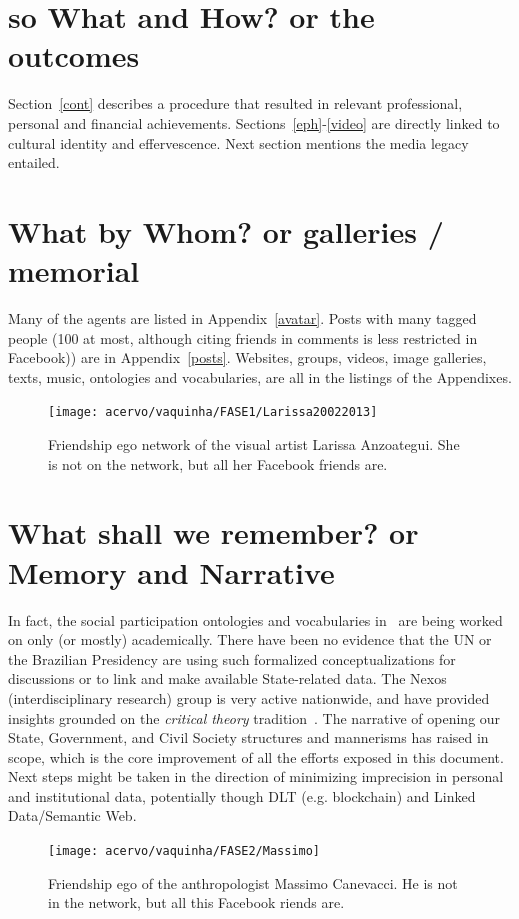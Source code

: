 \documentclass[a4paper]{article}
\begin{document}
\section{so What and How? or the outcomes}
Section~\ref{cont} describes a procedure that resulted in
relevant professional, personal and financial achievements.
Sections~\ref{eph}-\ref{video} are directly linked to cultural identity and effervescence.
Next section mentions the media legacy entailed.

\section{What by Whom? or galleries / memorial}
Many of the agents are listed in Appendix~\ref{avatar}.
Posts with many tagged people (100 at most, although citing friends in comments is less restricted in Facebook)) are in Appendix~\ref{posts}.
Websites, groups, videos, image galleries, texts, music, ontologies and vocabularies, are all in the listings of the Appendixes.

\begin{figure}[!h]
  \centering
    \texttt{[image: acervo/vaquinha/FASE1/Larissa20022013]}
  \caption{Friendship ego network of the visual artist Larissa Anzoategui. She is not on the network, but all her Facebook friends are.}
\end{figure}

\section{What shall we remember? or Memory and Narrative}
In fact, the social participation ontologies and vocabularies in~\cite{thesis}
are being worked on only (or mostly) academically.
There have been no evidence that the UN or the Brazilian Presidency are using
such formalized conceptualizations for discussions or to link and make available State-related data.
The Nexos (interdisciplinary research) group is very active nationwide,
and have provided insights grounded on the \emph{critical theory} tradition~\cite{anPhy2,thesis}.
The narrative of opening our State, Government, and Civil Society structures
and mannerisms has raised in scope, which is the core improvement of all
the efforts exposed in this document.
Next steps might be taken in the direction of minimizing imprecision
in personal and institutional data,
potentially though DLT (e.g. blockchain) and Linked Data/Semantic Web.

\begin{figure}[!h]
  \centering
    \texttt{[image: acervo/vaquinha/FASE2/Massimo]}
  \caption{Friendship ego of the anthropologist Massimo Canevacci. He is not in the network, but all this Facebook riends are.}
\end{figure}
\end{document}
